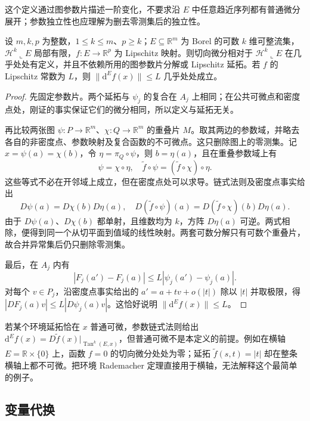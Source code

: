 这个定义通过图参数片描述一阶变化，不要求沿 \(E\) 中任意趋近序列都有普通微分展开；参数独立性也应理解为删去零测集后的独立性。

\begin{proposition}
\label{b1:prop:tangential-differential-independent}
设 \(m,k,p\) 为整数，\(1\leq k\leq m\)、\(p\geq k\)；\(E\subseteq\mathbb R^m\) 为 Borel 的可数 \(k\) 维可整流集，\(\mathcal H^k\llcorner E\) 局部有限，\(f:E\to\mathbb R^p\) 为 Lipschitz 映射。则切向微分相对于 \(\mathcal H^k\llcorner E\) 在几乎处处有定义，并且不依赖所用的图参数片分解或 Lipschitz 延拓。若 \(f\) 的 Lipschitz 常数为 \(L\)，则 \(\|\mathrm{d}^Ef(x)\|\leq L\) 几乎处处成立。
\end{proposition}
\begin{proof}
先固定参数片。两个延拓与 \(\psi_j\) 的复合在 \(A_j\) 上相同；在公共可微点和密度点处，刚证的事实保证它们的微分相同，所以定义与延拓无关。

再比较两张图 \(\psi:P\rightarrow\mathbb R^m\)、\(\chi:Q\rightarrow\mathbb R^m\) 的重叠片 \(M\)。取其两边的参数域，并略去各自的非密度点、参数映射及复合函数的不可微点。这只删除图上的零测集。记 \(x=\psi(a)=\chi(b)\)，令 \(\eta=\pi_Q\circ\psi\)，则 \(b=\eta(a)\)，且在重叠参数域上有
\[
 \psi=\chi\circ\eta,\quad
 \widetilde f\circ\psi=(\widetilde f\circ\chi)\circ\eta.
\]
这些等式不必在开邻域上成立，但在密度点处可以求导。链式法则及密度点事实给出
\[
 D\psi(a)=D\chi(b)D\eta(a),\quad
 D(\widetilde f\circ\psi)(a)
 =D(\widetilde f\circ\chi)(b)D\eta(a).
\]
由于 \(D\psi(a)\)、\(D\chi(b)\) 都单射，且维数均为 \(k\)，方阵 \(D\eta(a)\) 可逆。两式相除，便得到同一个从切平面到值域的线性映射。两套可数分解只有可数个重叠片，故合并异常集后仍只删除零测集。

最后，在 \(A_j\) 内有
\[
 |F_j(a')-F_j(a)|\leq L|\psi_j(a')-\psi_j(a)|.
\]
对每个 \(v\in P_j\)，沿密度点事实给出的 \(a'=a+tv+o(|t|)\) 除以 \(|t|\) 并取极限，得 \(|DF_j(a)v|\leq L|D\psi_j(a)v|\)。这恰好说明 \(\|\mathrm{d}^Ef(x)\|\leq L\)。
\end{proof}

若某个环境延拓恰在 \(x\) 普通可微，参数链式法则给出 \(\mathrm{d}^Ef(x)=D\widetilde f(x)|_{\operatorname{Tan}^k(E,x)}\)，但普通可微不是本定义的前提。例如在横轴 \(E=\mathbb R\times\{0\}\) 上，函数 \(f=0\) 的切向微分处处为零；延拓 \(\widetilde f(s,t)=|t|\) 却在整条横轴上都不可微。把环境 Rademacher 定理直接用于横轴，无法解释这个最简单的例子。

\subsection{变量代换}
\label{b1:subsec:190302}


